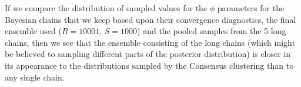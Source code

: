 \documentclass[]{article}
\begin{document}

If we compare the distribution of sampled values for the $\phi$ parameters for the Bayesian chains that we keep based upon their convergence diagnostics, the final ensemble used ($R=10001$, $S=1000$) and the pooled samples from the 5 long chains, then we see that the ensemble consisting of the long chains (which might be believed to sampling different parts of the posterior distribution) is closer in its appearance to the distributions sampled by the Consensus clustering than to any single chain. 


\end{document}
